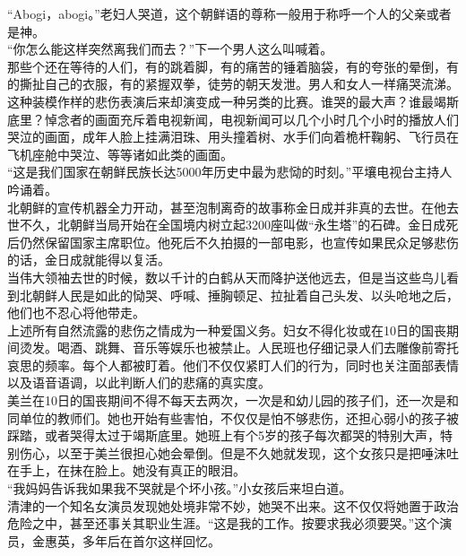 \begin{multicols}{\theparacolNo}
“Abogi，abogi。”老妇人哭道，这个朝鲜语的尊称一般用于称呼一个人的父亲或者是神。\\

“你怎么能这样突然离我们而去？”下一个男人这么叫喊着。\\

那些个还在等待的人们，有的跳着脚，有的痛苦的锤着脑袋，有的夸张的晕倒，有的撕扯自己的衣服，有的紧握双拳，徒劳的朝天发泄。男人和女人一样痛哭流涕。\\

这种装模作样的悲伤表演后来却演变成一种另类的比赛。谁哭的最大声？谁最竭斯底里？悼念者的画面充斥着电视新闻，电视新闻可以几个小时几个小时的播放人们哭泣的画面，成年人脸上挂满泪珠、用头撞着树、水手们向着桅杆鞠躬、飞行员在飞机座舱中哭泣、等等诸如此类的画面。\\

“这是我们国家在朝鲜民族长达5000年历史中最为悲恸的时刻。”平壤电视台主持人吟诵着。\\

北朝鲜的宣传机器全力开动，甚至泡制离奇的故事称金日成并非真的去世。在他去世不久，北朝鲜当局开始在全国境内树立起3200座叫做“永生塔”的石碑。金日成死后仍然保留国家主席职位。他死后不久拍摄的一部电影，也宣传如果民众足够悲伤的话，金日成就能得以复活。\\

当伟大领袖去世的时候，数以千计的白鹤从天而降护送他远去，但是当这些鸟儿看到北朝鲜人民是如此的恸哭、呼喊、捶胸顿足、拉扯着自己头发、以头呛地之后，他们也不忍心将他带走。\\

上述所有自然流露的悲伤之情成为一种爱国义务。妇女不得化妆或在10日的国丧期间烫发。喝酒、跳舞、音乐等娱乐也被禁止。人民班也仔细记录人们去雕像前寄托哀思的频率。每个人都被盯着。他们不仅仅紧盯人们的行为，同时也关注面部表情以及语音语调，以此判断人们的悲痛的真实度。\\

美兰在10日的国丧期间不得不每天去两次，一次是和幼儿园的孩子们，还一次是和同单位的教师们。她也开始有些害怕，不仅仅是怕不够悲伤，还担心弱小的孩子被踩踏，或者哭得太过于竭斯底里。她班上有个5岁的孩子每次都哭的特别大声，特别伤心，以至于美兰很担心她会晕倒。但是不久她就发现，这个女孩只是把唾沫吐在手上，在抹在脸上。她没有真正的眼泪。\\

“我妈妈告诉我如果我不哭就是个坏小孩。”小女孩后来坦白道。\\

清津的一个知名女演员发现她处境非常不妙，她哭不出来。这不仅仅将她置于政治危险之中，甚至还事关其职业生涯。“这是我的工作。按要求我必须要哭。”这个演员，金惠英，多年后在首尔这样回忆。\\


\end{multicols}
